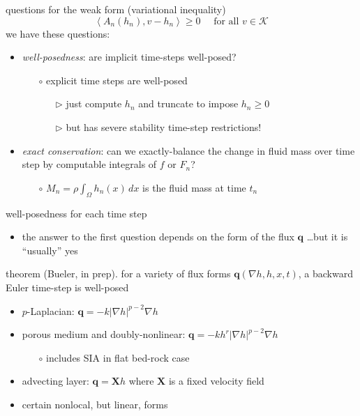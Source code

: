 \documentclass[hide notes,intlimits]{beamer}
\newcommand{\Kcal}{\mathcal{K}}
\newcommand{\bX}{\mathbf{X}}
\newcommand{\bq}{\mathbf{q}}
\newcommand{\grad}{\nabla}
\newcommand{\ip}[2]{\ensuremath{\left<#1,#2\right>}}
\begin{document}
\begin{frame}{questions}
for the weak form (variational inequality)
  $$\ip{A_n(h_n)}{v-h_n} \ge 0 \quad \text{ for all } v \in \Kcal$$
we have these questions:

\begin{itemize}
\item \emph{well-posedness}: are implicit time-steps well-posed?
    \begin{itemize}
    \item[$\circ$] explicit time steps are well-posed
       \begin{itemize}
       \item[$\triangleright$] just compute $h_n$ and truncate to impose $h_n\ge 0$
       \item[$\triangleright$] but has severe stability time-step restrictions!
       \end{itemize}
    \end{itemize}
\item \emph{exact conservation}: can we exactly-balance the change in fluid mass over time step by computable integrals of $f$ or $F_n$?
    \begin{itemize}
    \item[$\circ$] $M_n = \rho \int_\Omega h_n(x)\,dx$ is the fluid mass at time $t_n$
    \end{itemize}
\end{itemize}
\end{frame}


\begin{frame}{well-posedness for each time step}
\begin{itemize}
\item the answer to the first question depends on the form of the flux $\bq$ \dots but it is ``usually'' yes
\end{itemize}
\begin{block}{theorem (Bueler, in prep).}
for a variety of flux forms $\bq(\grad h,h,x,t)$, a backward Euler time-step is well-posed

\begin{itemize}
\item $p$-Laplacian: $\bq=-k|\grad h|^{p-2}\grad h$
\item porous medium and doubly-nonlinear: $\bq=-k h^r |\grad h|^{p-2}\grad h$
    \begin{itemize}
    \item[$\circ$] includes SIA in flat bed-rock case
    \end{itemize}
\item advecting layer: $\bq = \bX h$ where $\bX$ is a fixed velocity field
\item certain nonlocal, but linear, forms
\end{itemize}
\end{block}
\end{frame}
\end{document}
